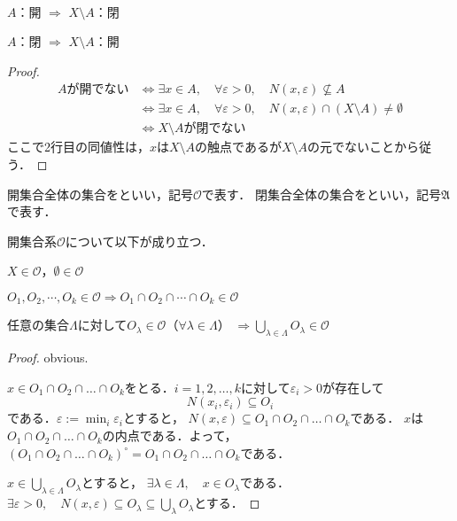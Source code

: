 \documentclass[uplatex]{jsarticle}
\begin{document}
\begin{prop}~\par
     $A$：開 $\Longrightarrow$ $X \setminus A$：閉\par
     $A$：閉 $\Longrightarrow$ $X \setminus A$：開
\end{prop}

\begin{proof}
    \begin{align*}
        A\text{が開でない} & \Longleftrightarrow \exists x \in A, \quad \forall \varepsilon > 0, \quad N(x, \varepsilon) \not\subseteq A \\
        & \Longleftrightarrow \exists x \in A, \quad \forall \varepsilon > 0, \quad N(x, \varepsilon) \cap (X \setminus A) \neq \emptyset \\
        & \Longleftrightarrow X \setminus A \text{が閉でない}
    \end{align*}
    ここで2行目の同値性は，$x$は$X \setminus A$の触点であるが$X \setminus A$の元でないことから従う．
\end{proof}

開集合全体の集合をといい，記号$\mathcal{O}$で表す．
閉集合全体の集合をといい，記号$\mathfrak{A}$で表す．

\begin{prop}
    \label{prop:open_set_axiom}
    開集合系$\mathcal{O}$について以下が成り立つ．\par
     $X \in \mathcal{O}$，$\emptyset \in \mathcal{O}$\par
     $O_{1}, O_{2}, \cdots, O_{k} \in \mathcal{O} \Longrightarrow O_{1} \cap O_{2} \cap \cdots \cap O_{k} \in \mathcal{O}$\par
     任意の集合$\Lambda$に対して$O_{\lambda} \in \mathcal{O}$（$\forall \lambda \in \Lambda$） ${\displaystyle \Longrightarrow \bigcup_{\lambda \in \Lambda} O_{\lambda} \in \mathcal{O}}$
\end{prop}

\begin{proof}
     obvious.

     $x \in O_{1} \cap O_{2} \cap \dots \cap O_{k}$をとる．$i = 1,2,\dots,k$に対して$\varepsilon_{i} > 0$が存在して
    \begin{equation*}
        N(x_{i}, \varepsilon_{i}) \subseteq O_{i}
    \end{equation*}
    である．${\displaystyle \varepsilon := \min_{i} \varepsilon_{i}}$とすると，
    $N(x, \varepsilon) \subseteq O_{1} \cap O_{2} \cap \dots \cap O_{k}$である．
    $x$は$O_{1} \cap O_{2} \cap \dots \cap O_{k}$の内点である．よって，$\left( O_{1} \cap O_{2} \cap \dots \cap O_{k} \right)^{\circ} = O_{1} \cap O_{2} \cap \dots \cap O_{k}$である．

     ${x \in \displaystyle \bigcup_{\lambda \in \Lambda} O_{\lambda}}$とすると，
    $\exists \lambda \in \Lambda, \quad x \in O_{\lambda}$である．${\displaystyle \exists \varepsilon > 0, \quad N(x, \varepsilon) \subseteq O_{\lambda} \subseteq \bigcup_{\lambda} O_{\lambda}}$とする．
\end{proof}
\end{document}
